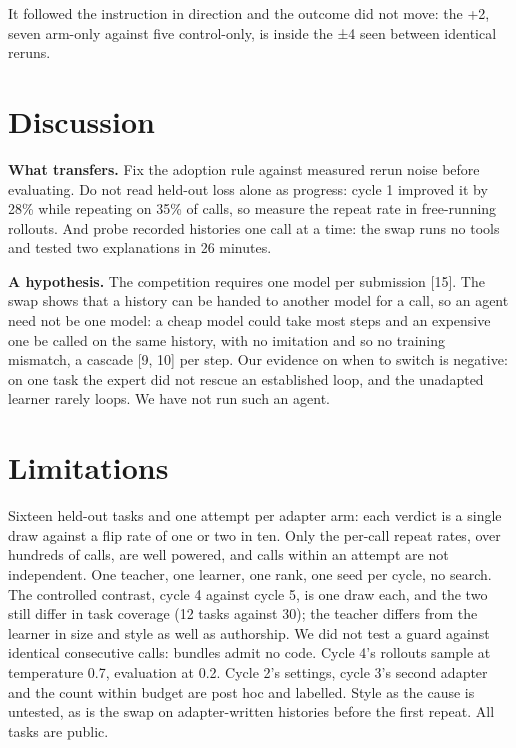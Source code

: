 \documentclass[
  11pt,
  a4paper,
]{article}
\begin{document}
It followed the instruction in direction and the outcome did not move:
the +2, seven arm-only against five control-only, is inside the ±4 seen
between identical reruns.

\section{Discussion}\label{discussion}

\textbf{What transfers.} Fix the adoption rule against measured rerun
noise before evaluating. Do not read held-out loss alone as progress:
cycle 1 improved it by 28\% while repeating on 35\% of calls, so measure
the repeat rate in free-running rollouts. And probe recorded histories
one call at a time: the swap runs no tools and tested two explanations
in 26 minutes.

\textbf{A hypothesis.} The competition requires one model per submission
{[}15{]}. The swap shows that a history can be handed to another model
for a call, so an agent need not be one model: a cheap model could take
most steps and an expensive one be called on the same history, with no
imitation and so no training mismatch, a cascade {[}9, 10{]} per step.
Our evidence on when to switch is negative: on one task the expert did
not rescue an established loop, and the unadapted learner rarely loops.
We have not run such an agent.

\section{Limitations}\label{limitations}

Sixteen held-out tasks and one attempt per adapter arm: each verdict is
a single draw against a flip rate of one or two in ten. Only the
per-call repeat rates, over hundreds of calls, are well powered, and
calls within an attempt are not independent. One teacher, one learner,
one rank, one seed per cycle, no search. The controlled contrast, cycle
4 against cycle 5, is one draw each, and the two still differ in task
coverage (12 tasks against 30); the teacher differs from the learner in
size and style as well as authorship. We did not test a guard against
identical consecutive calls: bundles admit no code. Cycle 4's rollouts
sample at temperature 0.7, evaluation at 0.2. Cycle 2's settings, cycle
3's second adapter and the count within budget are post hoc and
labelled. Style as the cause is untested, as is the swap on
adapter-written histories before the first repeat. All tasks are public.
\end{document}
